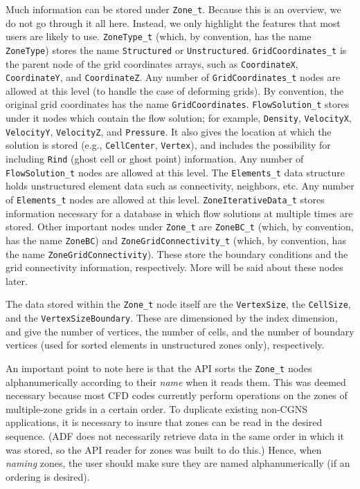 \documentclass[12pt]{article}
\begin{document}
Much information can be stored under {\tt Zone\_t}.  Because this is
an overview, we do not go through it all here.  Instead, we only
highlight the features that most users are likely to use. 
{\tt ZoneType\_t} (which, by convention, has the name {\tt ZoneType})
stores the name {\tt Structured} or {\tt Unstructured}.
{\tt GridCoordinates\_t} is the parent node of the grid coordinates 
arrays, such as
{\tt CoordinateX}, {\tt CoordinateY}, 
and {\tt CoordinateZ}.  
Any number of {\tt GridCoordinates\_t} nodes are
allowed at this level (to handle the case of deforming
grids).  By convention, the original grid coordinates
has the name {\tt GridCoordinates}.
{\tt FlowSolution\_t} stores under it nodes which contain the flow
solution; for example, {\tt Density}, {\tt VelocityX}, 
{\tt VelocityY},
{\tt VelocityZ}, and {\tt Pressure}.  It also gives the location
at which the solution is stored (e.g., {\tt CellCenter}, {\tt Vertex}), and
includes the possibility for including {\tt Rind} (ghost cell or ghost point) information.
Any number of {\tt FlowSolution\_t} nodes are
allowed at this level.  The {\tt Elements\_t} data structure holds
unstructured element data such as connectivity, neighbors,
etc.  Any number of 
{\tt Elements\_t} nodes are allowed at this level.
{\tt ZoneIterativeData\_t} stores information necessary
for a database in which flow solutions at multiple times are stored.
Other important nodes under {\tt Zone\_t} are {\tt ZoneBC\_t}
(which, by convention, has the name {\tt ZoneBC})
and {\tt ZoneGridConnectivity\_t} (which, by convention, has the name 
{\tt ZoneGridConnectivity}).  These store the boundary conditions and
the grid connectivity information, respectively.
More will be said about these nodes later.

The data stored within the {\tt Zone\_t} node itself are the
{\tt VertexSize}, the {\tt CellSize}, and the {\tt VertexSizeBoundary}.  These
are dimensioned by the index dimension, and give the number
of vertices, the number of cells, and the number of boundary
vertices (used for sorted elements in unstructured zones only),
respectively.

An important point to note here is that the API sorts the {\tt Zone\_t}
nodes alphanumerically according to their {\it name} when
it reads them.  This
was deemed necessary because most CFD codes currently perform
operations on the zones of multiple-zone grids in a certain order.
To duplicate existing non-CGNS applications, it is 
necessary to insure that zones can be read in the desired
sequence.  (ADF does not necessarily retrieve data in the same 
order in which it was stored, so the API reader for zones was
built to do this.)  Hence, when {\it naming} zones, the user should
make sure they are named alphanumerically (if an ordering is
desired).
\end{document}
